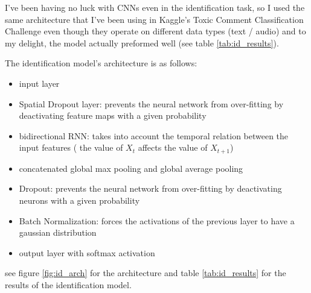 \documentclass{article}
\begin{document}
I've been having no luck with CNNs even in the identification task, so I used the same architecture that I've been using in Kaggle's Toxic Comment Classification Challenge even though they operate on different data types (text / audio) and to my delight, the model actually preformed well (see table \ref{tab:id_results}).

The identification model's architecture is as follows:
\begin{itemize}
    \item input layer 
    \item Spatial Dropout layer: prevents the neural network from over-fitting by deactivating feature maps with a given probability
    \item bidirectional RNN: takes into account the temporal relation between the input features ( the value of $X_t$ affects the value of $X_{t+1}$)
    \item concatenated global max pooling and global average pooling
    \item Dropout:  prevents the neural network from over-fitting by deactivating neurons with a given probability
    \item Batch Normalization: forces the activations of the previous layer to have a gaussian distribution  \cite{chollet2015keras}
    \item output layer with softmax activation
\end{itemize}
see figure \ref{fig:id_arch} for the architecture and table \ref{tab:id_results} for the results of the identification model.
\end{document}
